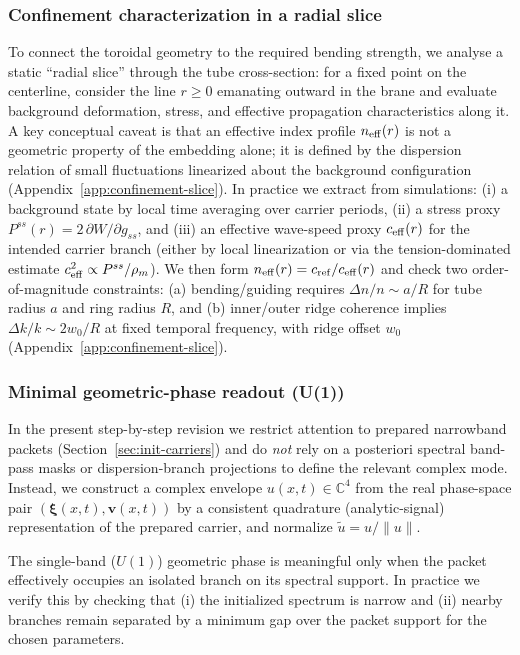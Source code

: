 \subsubsection{Confinement characterization in a radial slice}
To connect the toroidal geometry to the required bending strength, we analyse a static ``radial slice''
through the tube cross-section: for a fixed point on the centerline, consider the line $r\ge 0$
emanating outward in the brane and evaluate background deformation, stress, and effective propagation
characteristics along it.
A key conceptual caveat is that an effective index profile $n_{\rm eff}(r)$ is not a geometric
property of the embedding alone; it is defined by the dispersion relation of small fluctuations
linearized about the background configuration (Appendix~\ref{app:confinement-slice}).
In practice we extract from simulations:
(i) a background state by local time averaging over carrier periods,
(ii) a stress proxy $P^{ss}(r)=2\,\partial W/\partial g_{ss}$, and
(iii) an effective wave-speed proxy $c_{\rm eff}(r)$ for the intended carrier branch (either by local
linearization or via the tension-dominated estimate $c_{\rm eff}^2\propto P^{ss}/\rho_m$).
We then form $n_{\rm eff}(r)=c_{\rm ref}/c_{\rm eff}(r)$ and check two order-of-magnitude constraints:
(a) bending/guiding requires $\Delta n/n\sim a/R$ for tube radius $a$ and ring radius $R$, and
(b) inner/outer ridge coherence implies $\Delta k/k\sim 2w_0/R$ at fixed temporal frequency, with
ridge offset $w_0$ (Appendix~\ref{app:confinement-slice}).

\subsubsection{Minimal geometric-phase readout (U(1))}
In the present step-by-step revision we restrict attention to prepared narrowband packets
(Section~\ref{sec:init-carriers}) and do \emph{not} rely on a posteriori spectral band-pass masks
or dispersion-branch projections to define the relevant complex mode.
Instead, we construct a complex envelope $u(x,t)\in\mathbb C^4$ from the real phase-space pair
$(\boldsymbol\xi(x,t),\mathbf v(x,t))$ by a consistent quadrature (analytic-signal) representation
of the prepared carrier, and normalize $\tilde u=u/\|u\|$.

The single-band ($U(1)$) geometric phase is meaningful only when the packet effectively occupies
an isolated branch on its spectral support. In practice we verify this by checking that (i) the
initialized spectrum is narrow and (ii) nearby branches remain separated by a minimum gap over the
packet support for the chosen parameters.

